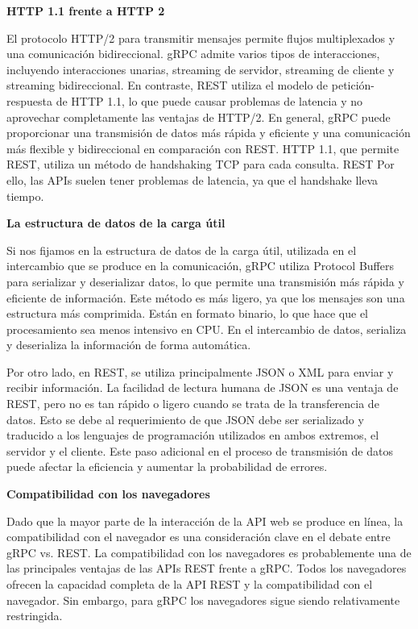 \textbf{HTTP 1.1 frente a HTTP 2}

El protocolo HTTP/2 para transmitir mensajes permite flujos multiplexados y una comunicación bidireccional. gRPC admite varios tipos de interacciones, incluyendo interacciones unarias, streaming de servidor, streaming de cliente y streaming bidireccional. En contraste, REST utiliza el modelo de petición-respuesta de HTTP 1.1, lo que puede causar problemas de latencia y no aprovechar completamente las ventajas de HTTP/2. En general, gRPC puede proporcionar una transmisión de datos más rápida y eficiente y una comunicación más flexible y bidireccional en comparación con REST. HTTP 1.1, que permite REST, utiliza un método de handshaking TCP para cada consulta. REST Por ello, las APIs suelen tener problemas de latencia, ya que el handshake lleva tiempo.

\textbf{La estructura de datos de la carga útil}

Si nos fijamos en la estructura de datos de la carga útil, utilizada en el intercambio que se produce en la comunicación, gRPC utiliza Protocol Buffers para serializar y deserializar datos, lo que permite una transmisión más rápida y eficiente de información. Este método es más ligero, ya que los mensajes son una estructura más comprimida. Están en formato binario, lo que hace que el procesamiento sea menos intensivo en CPU. En el intercambio de datos, serializa y deserializa la información de forma automática.

Por otro lado, en REST, se utiliza principalmente JSON o XML para enviar y recibir información. La facilidad de lectura humana de JSON es una ventaja de REST, pero no es tan rápido o ligero cuando se trata de la transferencia de datos. Esto se debe al requerimiento de que JSON debe ser serializado y traducido a los lenguajes de programación utilizados en ambos extremos, el servidor y el cliente. Este paso adicional en el proceso de transmisión de datos puede afectar la eficiencia y aumentar la probabilidad de errores.


\textbf{Compatibilidad con los navegadores}\label{GRPCcompatibilidadConNavegadores}

Dado que la mayor parte de la interacción de la API web se produce en línea, la compatibilidad con el navegador es una consideración clave en el debate entre gRPC vs. REST. La compatibilidad con los navegadores es probablemente una de las principales ventajas de las APIs REST frente a gRPC. Todos los navegadores ofrecen la capacidad completa de la API REST y la compatibilidad con el navegador. Sin embargo, para gRPC los navegadores sigue siendo relativamente restringida.

